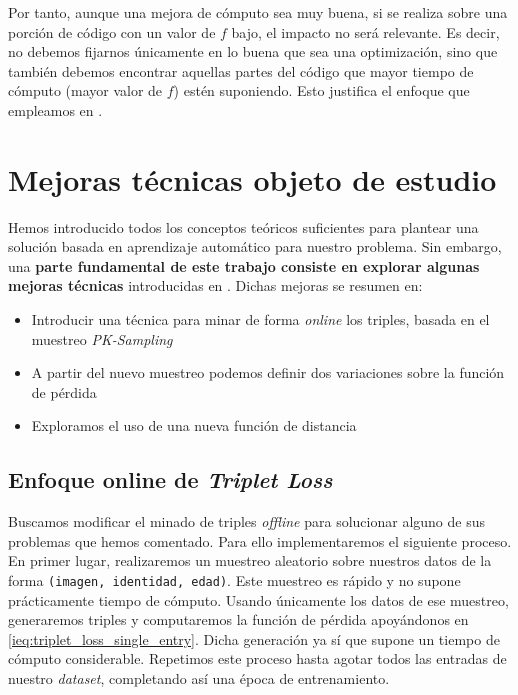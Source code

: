 Por tanto, aunque una mejora de cómputo sea muy buena, si se realiza sobre una porción de código con un valor de $f$ bajo, el impacto no será relevante. Es decir, no debemos fijarnos únicamente en lo buena que sea una optimización, sino que también debemos encontrar aquellas partes del código que mayor tiempo de cómputo (mayor valor de $f$) estén suponiendo. Esto justifica el enfoque que empleamos en .

\section{Mejoras técnicas objeto de estudio} \label{isec:mejoras_tecnicas_objeto_de_estudio}

Hemos introducido todos los conceptos teóricos suficientes para plantear una solución basada en aprendizaje automático para nuestro problema. Sin embargo, una \textbf{parte fundamental de este trabajo consiste en explorar algunas mejoras técnicas} introducidas en \cite{informatica:principal}. Dichas mejoras se resumen en:

\begin{itemize}
    \item Introducir una técnica para minar de forma \textit{online} los triples, basada en el muestreo \textit{PK-Sampling}
    \item A partir del nuevo muestreo podemos definir dos variaciones sobre la función de pérdida
    \item Exploramos el uso de una nueva función de distancia
\end{itemize}

\subsection{Enfoque online de \textit{Triplet Loss}} \label{isubs:triples_online}

Buscamos modificar el minado de triples \textit{offline} para solucionar alguno de sus problemas que hemos comentado. Para ello implementaremos el siguiente proceso. En primer lugar, realizaremos un muestreo aleatorio sobre nuestros datos de la forma \lstinline{(imagen, identidad, edad)}. Este muestreo es rápido y no supone prácticamente tiempo de cómputo. Usando únicamente los datos de ese muestreo, generaremos triples y computaremos la función de pérdida apoyándonos en \eqref{ieq:triplet_loss_single_entry}. Dicha generación ya sí que supone un tiempo de cómputo considerable. Repetimos este proceso hasta agotar todos las entradas de nuestro \textit{dataset}, completando así una época de entrenamiento.

